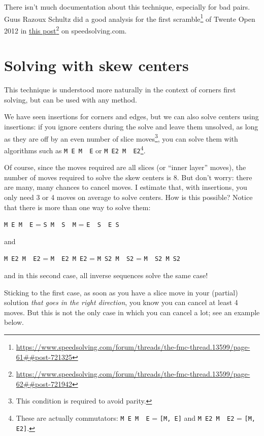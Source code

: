 \documentclass[11pt,a4paper]{book}
\newcommand{\p}{\textquotesingle}
\newcommand{\m}{\texttt}
\newcommand{\ps}{\p\,\,}
\begin{document}
There isn't much documentation about this technique, especially for bad pairs. Guus Razoux Schultz did a good analysis for the first scramble\footnote{\url{https://www.speedsolving.com/forum/threads/the-fmc-thread.13599/page-61##post-721325}} of Twente Open 2012 in \href{https://www.speedsolving.com/forum/threads/the-fmc-thread.13599/page-62##post-721942}{this post}\footnote{\url{https://www.speedsolving.com/forum/threads/the-fmc-thread.13599/page-62##post-721942}} on speedsolving.com. 

\section{Solving with skew centers}
\label{skew_centers}

This technique is understood more naturally in the context of corners first solving, but can be used with any method.

We have seen insertions for corners and edges, but we can also solve centers using insertions: if you ignore centers during the solve and leave them unsolved, as long as they are off by an even number of slice moves\footnote{This condition is required to avoid parity.}, you can solve them with algorithms such as \m{M E M\ps E\p} or \m{M E2 M\ps E2}\footnote{These are actually commutators: \m{M E M\ps E\p} = \m{[M, E]} and \m{M E2 M\ps E2} = \m{[M, E2]}.}.

Of course, since the moves required are all slices (or ``inner layer'' moves), the number of moves required to solve the skew centers is 8. But don't worry: there are many, many chances to cancel moves. I estimate that, with insertions, you only need 3 or 4 moves on average to solve centers. How is this possible? Notice that there is more than one way to solve them:

\begin{center}
\m{M E M\ps E\p} = \m{S M\ps S\ps M} = \m{E\ps S\ps E S}
\end{center}

and 

\begin{center}
\m{M E2 M\ps E2} = \m{M\ps E2 M E2} = \m{M S2 M\ps S2} = \m{M\ps S2 M S2}
\end{center}

and in this second case, all inverse sequences solve the same case!

Sticking to the first case, as soon as you have a slice move in your (partial) solution \emph{that goes in the right direction}, you know you can cancel at least 4 moves. But this is not the only case in which you can cancel a lot; see an example below.%
\end{document}

